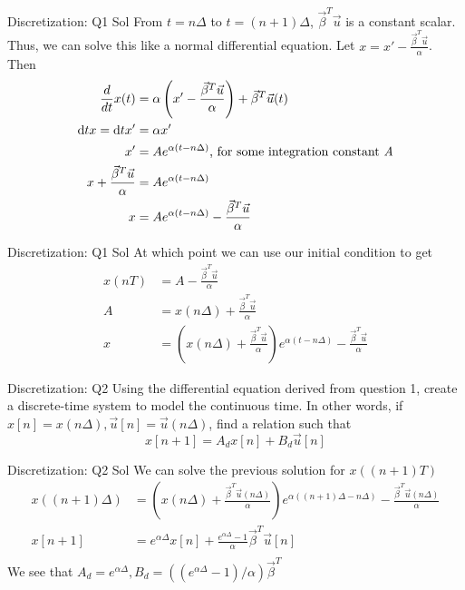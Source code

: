 \documentclass{beamer}
\begin{document}
\begin{frame}{Discretization: Q1 Sol}
From $t = n \Delta$ to $t = (n + 1) \Delta$, $\vec{\beta}^T \vec{u}$ is a constant scalar. Thus, we can solve this like a normal differential equation. Let $x = x' - \frac{\vec \beta^T \vec u}{\alpha}$. Then
\begin{align*}
\frac{d}{dt} x(t) &= \alpha \left(x' - \frac{\vec \beta^T \vec u}{\alpha}\right) + \vec{\beta}^T \vec u(t) \\
\mathrm d{t}x = \mathrm d{t}x' &= \alpha x' \\
x' &= A e^{\alpha (t - n \Delta)} \text{, for some integration constant \em{A}} \\
x + \frac{\vec \beta^T \vec u}{\alpha} &= A e^{\alpha (t - n \Delta)} \\
x &= A e^{\alpha (t - n \Delta)} - \frac{\vec \beta^T \vec u}{\alpha}
\end{align*}
\end{frame}
\begin{frame}{Discretization: Q1 Sol}
At which point we can use our initial condition to get
\begin{align*}
x(nT) &= A - \frac{\vec \beta^T \vec u}{\alpha} \\
A &= x(n \Delta) + \frac{\vec \beta^T \vec u}{\alpha} \\
x &= \left( x(n \Delta) + \frac{\vec \beta^T \vec u}{\alpha} \right) e^{\alpha (t - n \Delta)} - \frac{\vec \beta^T \vec u}{\alpha}
\end{align*}
\end{frame}

\begin{frame}{Discretization: Q2}
Using the differential equation derived from question 1, create a discrete-time system to model the continuous time. In other words, if $x[n] = x(n \Delta), \vec{u}[n] = \vec{u}(n \Delta)$, find a relation such that
\[ x[n + 1] = A_d x[n] + B_d \vec{u}[n] \]
\end{frame}

\begin{frame}{Discretization: Q2 Sol}
We can solve the previous solution for $x((n + 1)T)$
\begin{align*}
x((n + 1) \Delta) &= \left( x(n \Delta) + \frac{\vec \beta^T \vec u(n \Delta)}{\alpha} \right) e^{\alpha ((n + 1)\Delta - n \Delta)} - \frac{\vec \beta^T \vec u(n \Delta)}{\alpha} \\
x[n + 1] &= e^{\alpha \Delta} x[n] + \frac{e^{\alpha \Delta} - 1}{\alpha} \vec{\beta}^T \vec{u}[n] \\
\end{align*}
We see that $A_d = e^{\alpha \Delta}, B_d = ((e^{\alpha \Delta} - 1) / \alpha) \vec{\beta}^T$
\end{frame}
\end{document}
